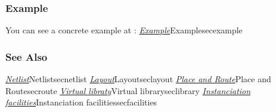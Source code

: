 \begin{htmlonly}

\subsubsection{Example}

You can see a concrete example at : \hyperref[ref]{\emph{Example}}{}{Example}{secexample}

\subsubsection{See Also}

\hyperref[ref]{\emph{Netlist}}{}{Netlist}{secnetlist}
\hyperref[ref]{\emph{Layout}}{}{Layout}{seclayout}
\hyperref[ref]{\emph{Place and Route}}{}{Place and Route}{secroute}
\hyperref[ref]{\emph{Virtual libraty}}{}{Virtual library}{seclibrary}
\hyperref[ref]{\emph{Instanciation facilities}}{}{Instanciation facilities}{secfacilities}

\end{htmlonly}
